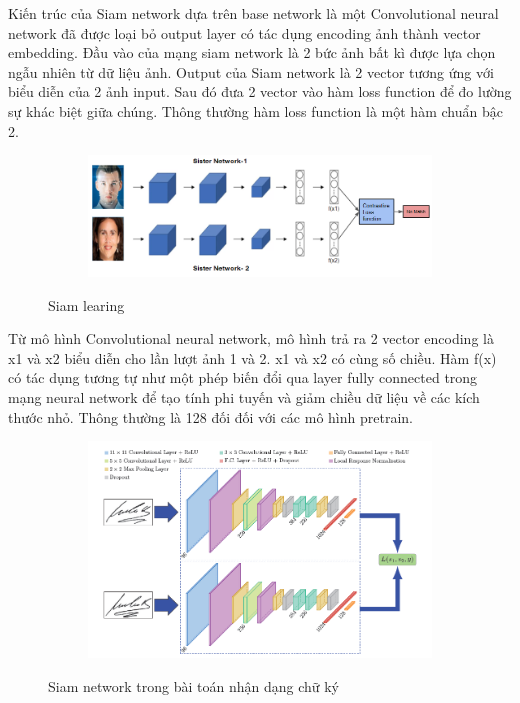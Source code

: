 Kiến trúc của Siam network dựa trên base network là một Convolutional neural network
đã được loại bỏ output layer có tác dụng encoding ảnh thành vector embedding.
Đầu vào của mạng siam network là 2 bức ảnh bất kì được lựa chọn ngẫu nhiên từ dữ liệu ảnh.
Output của Siam network là 2 vector tương ứng với biểu diễn của 2 ảnh input.
Sau đó đưa 2 vector vào hàm loss function để đo lường sự khác biệt giữa chúng.
Thông thường hàm loss function là một hàm chuẩn bậc 2.

\begin{figure}
    \begin{subfigure}{1.\textwidth}
        \begin{center}
            \includegraphics[width=1.\linewidth]{Chapters/items/chap2_16.jpg}
        \end{center}
        \label{fig: chap2_16}
    \end{subfigure}
    \caption{Siam learing}
\end{figure}

\newpage
Từ mô hình Convolutional neural network, mô hình trả ra 2 vector encoding là x1 và x2
biểu diễn cho lần lượt ảnh 1 và 2. x1 và x2 có cùng số chiều.
Hàm f(x) có tác dụng tương tự như một phép biến đổi qua layer fully connected
trong mạng neural network để tạo tính phi tuyến và giảm chiều dữ liệu về các kích thước nhỏ.
Thông thường là 128 đối đối với các mô hình pretrain.

\begin{figure}
    \begin{subfigure}{1.\textwidth}
        \begin{center}
            \includegraphics[width=1.\linewidth]{Chapters/items/siam.png}
        \end{center}
        \label{fig: siam}
    \end{subfigure}
    \caption{Siam network trong bài toán nhận dạng chữ ký}
\end{figure}


